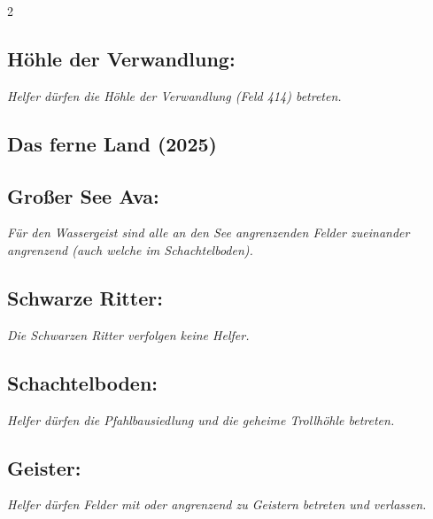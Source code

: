 \documentclass[10pt, a4paper, oneside]{book}
\newcommand{\fan}[1]{\textit{#1}}
\begin{document}
\begin{multicols*}{2}
\begin{bgcolor}
\subsection{Höhle der Verwandlung:}

\fan{Helfer dürfen die Höhle der Verwandlung (Feld 414) betreten.}

\end{bgcolor}








\begin{bgcolor}
\section{Das ferne Land (2025)}



\subsection{Großer See Ava:}

\fan{Für den Wassergeist sind alle an den See angrenzenden Felder zueinander angrenzend (auch welche im Schachtelboden).}



\subsection{Schwarze Ritter:}

\fan{Die Schwarzen Ritter verfolgen keine Helfer.}


\subsection{Schachtelboden:}

\fan{Helfer dürfen die Pfahlbausiedlung und die geheime Trollhöhle betreten.}





\subsection{Geister:}

\fan{Helfer dürfen Felder mit oder angrenzend zu Geistern betreten und verlassen.}

\end{bgcolor}

\end{multicols*}
\end{document}
